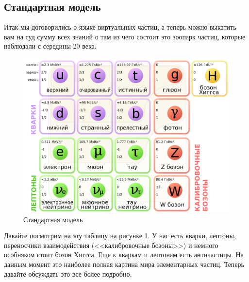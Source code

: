 \documentclass[12pt]{article}
\begin{document}
\subsection{Стандартная модель}
Итак мы договорились о языке виртуальных частиц, а теперь можно выкатить вам на суд сумму всех знаний о там из чего состоит это зоопарк частиц, которые наблюдали с середины 20 века.
\begin{figure}[h]
    \centering
    \includegraphics[width=\textwidth,height=\textheight,keepaspectratio]{Seminar_11/pics/pic_01_standart_model.png}
    \caption{Стандартная модель}
    \label{fig:sem_11_model}
\end{figure}

Давайте посмотрим на эту таблицу  на рисунке \ref{fig:sem_11_model}. У нас есть кварки, лептоны, переносчики взаимодействия (<<калибровочные бозоны>>) и немного особняком стоит бозон Хиггса. Еще к кваркам и лептонам есть античастицы. На данным момент это наиболее полная картина мира элементарных частиц. Теперь давайте обсуждать это все более подробно.
\end{document}
